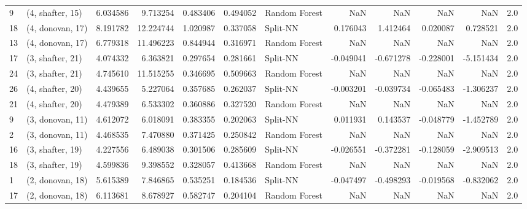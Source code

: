 \begin{tabular}{llrrrrlrrrrr}
9  &  (4, shafter, 15) &  6.034586 &   9.713254 &   0.483406 &  0.494052 &  Random Forest &             NaN &           NaN &            NaN &          NaN &            2.0 \\
18 &  (4, donovan, 17) &  8.191782 &  12.224744 &   1.020987 &  0.337058 &       Split-NN &        0.176043 &      1.412464 &       0.020087 &     0.728521 &            2.0 \\
13 &  (4, donovan, 17) &  6.779318 &  11.496223 &   0.844944 &  0.316971 &  Random Forest &             NaN &           NaN &            NaN &          NaN &            2.0 \\
17 &  (3, shafter, 21) &  4.074332 &   6.363821 &   0.297654 &  0.281661 &       Split-NN &       -0.049041 &     -0.671278 &      -0.228001 &    -5.151434 &            2.0 \\
24 &  (3, shafter, 21) &  4.745610 &  11.515255 &   0.346695 &  0.509663 &  Random Forest &             NaN &           NaN &            NaN &          NaN &            2.0 \\
26 &  (4, shafter, 20) &  4.439655 &   5.227064 &   0.357685 &  0.262037 &       Split-NN &       -0.003201 &     -0.039734 &      -0.065483 &    -1.306237 &            2.0 \\
21 &  (4, shafter, 20) &  4.479389 &   6.533302 &   0.360886 &  0.327520 &  Random Forest &             NaN &           NaN &            NaN &          NaN &            2.0 \\
9  &  (3, donovan, 11) &  4.612072 &   6.018091 &   0.383355 &  0.202063 &       Split-NN &        0.011931 &      0.143537 &      -0.048779 &    -1.452789 &            2.0 \\
2  &  (3, donovan, 11) &  4.468535 &   7.470880 &   0.371425 &  0.250842 &  Random Forest &             NaN &           NaN &            NaN &          NaN &            2.0 \\
16 &  (3, shafter, 19) &  4.227556 &   6.489038 &   0.301506 &  0.285609 &       Split-NN &       -0.026551 &     -0.372281 &      -0.128059 &    -2.909513 &            2.0 \\
18 &  (3, shafter, 19) &  4.599836 &   9.398552 &   0.328057 &  0.413668 &  Random Forest &             NaN &           NaN &            NaN &          NaN &            2.0 \\
1  &  (2, donovan, 18) &  5.615389 &   7.846865 &   0.535251 &  0.184536 &       Split-NN &       -0.047497 &     -0.498293 &      -0.019568 &    -0.832062 &            2.0 \\
17 &  (2, donovan, 18) &  6.113681 &   8.678927 &   0.582747 &  0.204104 &  Random Forest &             NaN &           NaN &            NaN &          NaN &            2.0 \\

\end{tabular}
